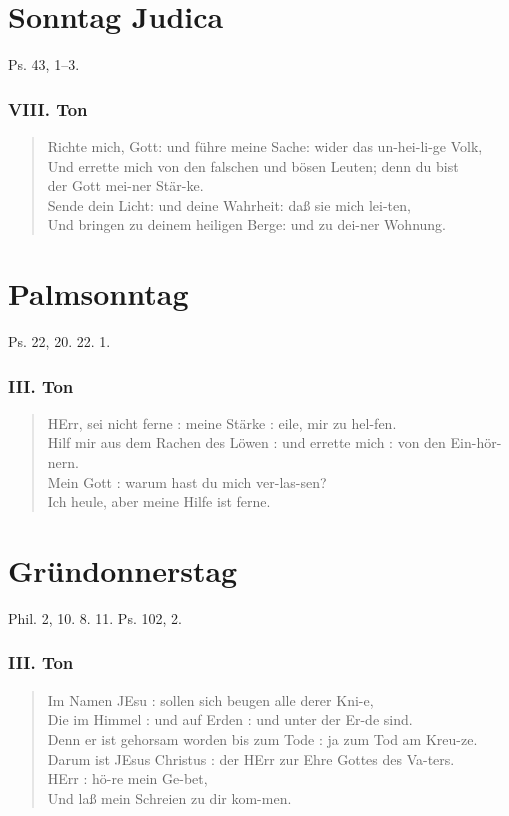 \section{Sonntag Judica}

Ps. 43, 1–3.

\subsubsection{VIII. Ton}
\begin{verse}
Richte mich, Gott: und führe meine Sache: wider das un-hei-li-ge Volk,\\
Und errette mich von den falschen und bösen Leuten; denn du bist\\
der Gott mei-ner Stär-ke.\\
Sende dein Licht: und deine Wahrheit: daß sie mich lei-ten,\\
Und bringen zu deinem heiligen Berge: und zu dei-ner Wohnung.
\end{verse}

\section{Palmsonntag}

Ps. 22, 20. 22. 1.

\subsubsection{III. Ton}
\begin{verse}
HErr, sei nicht ferne : meine Stärke : eile, mir zu hel-fen.\\
Hilf mir aus dem Rachen des Löwen : und errette mich : von den Ein-hör-nern.\\
Mein Gott : warum hast du mich ver-las-sen?\\
Ich heule, aber meine Hilfe ist ferne.
\end{verse}

\section{Gründonnerstag}

Phil. 2, 10. 8. 11. Ps. 102, 2.

\subsubsection{III. Ton}
\begin{verse}
Im Namen JEsu : sollen sich beugen alle derer Kni-e,\\
Die im Himmel : und auf Erden : und unter der Er-de sind.\\
Denn er ist gehorsam worden bis zum Tode : ja zum Tod am Kreu-ze.\\
Darum ist JEsus Christus : der HErr zur Ehre Gottes des Va-ters.\\
HErr : hö-re mein Ge-bet,\\
Und laß mein Schreien zu dir kom-men.
\end{verse}

